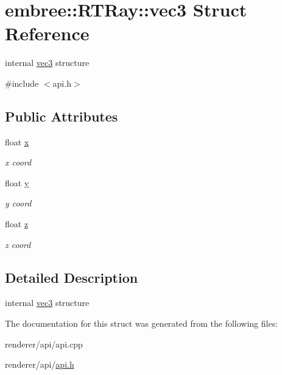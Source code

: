 \hypertarget{structembree_1_1_r_t_ray_1_1vec3}{
\section{embree::RTRay::vec3 Struct Reference}
\label{structembree_1_1_r_t_ray_1_1vec3}
}


internal \hyperlink{structembree_1_1_r_t_ray_1_1vec3}{vec3} structure  




{\ttfamily \#include $<$api.h$>$}

\subsection*{Public Attributes}
\begin{DoxyCompactItemize}
\item 
\hypertarget{structembree_1_1_r_t_ray_1_1vec3_a68882c3853500489e0996a6ba34f3731}{
float \hyperlink{structembree_1_1_r_t_ray_1_1vec3_a68882c3853500489e0996a6ba34f3731}{x}}
\label{structembree_1_1_r_t_ray_1_1vec3_a68882c3853500489e0996a6ba34f3731}

\begin{DoxyCompactList}\small\item\em x coord \item\end{DoxyCompactList}\item 
\hypertarget{structembree_1_1_r_t_ray_1_1vec3_a754f979861eb90a14772602b63d5aaf3}{
float \hyperlink{structembree_1_1_r_t_ray_1_1vec3_a754f979861eb90a14772602b63d5aaf3}{y}}
\label{structembree_1_1_r_t_ray_1_1vec3_a754f979861eb90a14772602b63d5aaf3}

\begin{DoxyCompactList}\small\item\em y coord \item\end{DoxyCompactList}\item 
\hypertarget{structembree_1_1_r_t_ray_1_1vec3_ad8614ac51939003de582ba67202260a2}{
float \hyperlink{structembree_1_1_r_t_ray_1_1vec3_ad8614ac51939003de582ba67202260a2}{z}}
\label{structembree_1_1_r_t_ray_1_1vec3_ad8614ac51939003de582ba67202260a2}

\begin{DoxyCompactList}\small\item\em z coord \item\end{DoxyCompactList}\end{DoxyCompactItemize}


\subsection{Detailed Description}
internal \hyperlink{structembree_1_1_r_t_ray_1_1vec3}{vec3} structure 

The documentation for this struct was generated from the following files:\begin{DoxyCompactItemize}
\item 
renderer/api/api.cpp\item 
renderer/api/\hyperlink{api_8h}{api.h}\end{DoxyCompactItemize}
